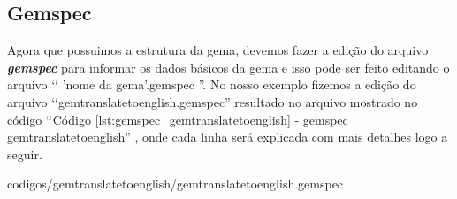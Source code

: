 \subsection{Gemspec}
\label{subsection:gemspec}

Agora que possuimos a estrutura da gema, devemos fazer a edição do arquivo \emph{\textbf{gemspec}} 
para informar os dados básicos da gema e isso pode ser feito editando o arquivo ‘‘ 'nome da gema'.gemspec ''. 
No nosso exemplo fizemos a edição do arquivo ‘‘gemtranslatetoenglish.gemspec'' resultado no arquivo mostrado 
no código ‘‘Código \ref{lst:gemspec_gemtranslatetoenglish} - gemspec gemtranslatetoenglish''
, onde cada linha será explicada com mais detalhes logo a seguir.


{codigos/gemtranslatetoenglish/gemtranslatetoenglish.gemspec}

